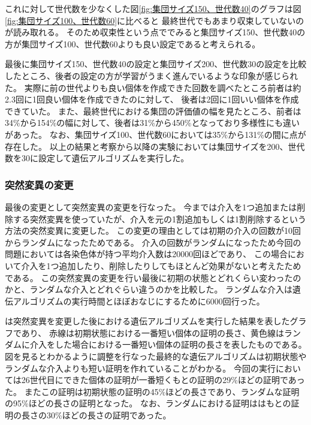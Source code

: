 これに対して世代数を少なくした図\ref{fig:集団サイズ150、世代数40}のグラフは図\ref{fig:集団サイズ100、世代数60}に比べると
最終世代でもあまり収束していないのが読み取れる。
そのため収束性という点ででみると集団サイズ150、世代数40の方が集団サイズ100、世代数60よりも良い設定であると考えられる。

最後に集団サイズ150、世代数40の設定と集団サイズ200、世代数30の設定を比較したところ、後者の設定の方が学習がうまく進んでいるような印象が感じられた。
実際に前の世代よりも良い個体を作成できた回数を調べたところ前者は約2.3回に1回良い個体を作成できたのに対して、
後者は2回に1回いい個体を作成できていた。
また、最終世代における集団の評価値の幅を見たところ、前者は34\%から154\%の幅に対して、後者は31\%から450\%となっており多様性にも違いがあった。
なお、集団サイズ100、世代数60においては35\%から131\%の間に点が存在した。
以上の結果と考察から以降の実験においては集団サイズを200、世代数を30に設定して遺伝アルゴリズムを実行した。



\subsubsection{突然変異の変更}
最後の変更として突然変異の変更を行なった。
今までは介入を1つ追加または削除する突然変異を使っていたが、介入を元の1割追加もしくは1割削除するという方法の突然変異に変更した。
この変更の理由としては初期の介入の回数が10回からランダムになったためである。
介入の回数がランダムになったため今回の問題においては各染色体が持つ平均介入数は20000回ほどであり、
この場合において介入を1つ追加したり、削除したりしてもほとんど効果がないと考えたためである。
この突然変異の変更を行い最後に初期の状態とどれくらい変わったのかと、ランダムな介入とどれぐらい違うのかを比較した。
ランダムな介入は遺伝アルゴリズムの実行時間とほぼおなじにするために6000回行った。


は突然変異を変更した後における遺伝アルゴリズムを実行した結果を表したグラフであり、
赤線は初期状態における一番短い個体の証明の長さ、黄色線はランダムに介入をした場合における一番短い個体の証明の長さを表したものである。
図を見るとわかるように調整を行なった最終的な遺伝アルゴリズムは初期状態やランダムな介入よりも短い証明を作れていることがわかる。
今回の実行においては26世代目にできた個体の証明が一番短くもとの証明の29\%ほどの証明であった。
またこの証明は初期状態の証明の45\%ほどの長さであり、ランダムな証明の95\%ほどの長さの証明となった。
なお、ランダムにおける証明ははもとの証明の長さの30\%ほどの長さの証明であった。


